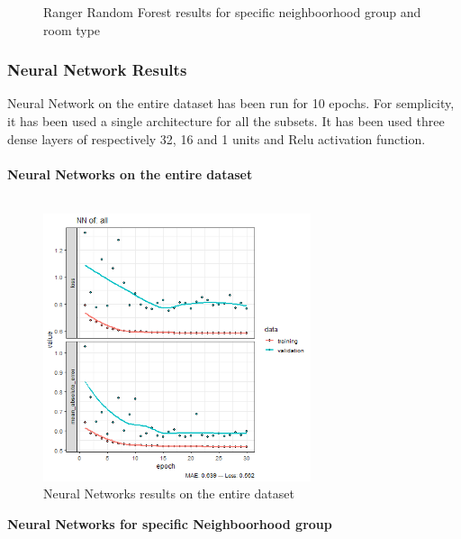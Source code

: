 \documentclass{FR16}
\begin{document}
\begin{figure}[!htb]
\begin{minipage}{0.48\textwidth}
   \end{minipage}
        \caption{Ranger Random Forest results for specific neighboorhood group and room type}\label{fig:18}

\end{figure}





\newpage
\subsubsection{Neural Network Results}
 Neural Network on the entire dataset has been run for 10 epochs. For semplicity, it has been used a single architecture for all the subsets. It has been used three dense layers of respectively 32, 16 and 1 units and Relu activation function.\\\\
\textbf{Neural Networks on the entire dataset }\\\\

\begin{figure}[h]
\centering
\includegraphics[width=0.7\textwidth]{figures/NN-all.PNG} 
 \caption{\label{fig:19} Neural Networks results on the entire dataset}
\end{figure}

\newpage
\textbf{Neural Networks for specific Neighboorhood group}\\
\end{document}

